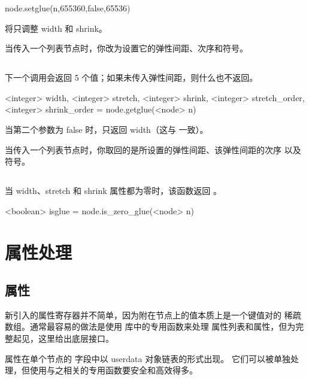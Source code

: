 \begin{typing}
node.setglue(n,655360,false,65536)
\end{typing}

将只调整 width 和 shrink。

当传入一个列表节点时，你改为设置它的弹性间距、次序和符号。

\subsection{}


下一个调用会返回 5 个值；如果未传入弹性间距，则什么也不返回。

\begin{typing}
<integer> width, <integer> stretch, <integer> shrink, <integer> stretch_order,
    <integer> shrink_order = node.getglue(<node> n)
\end{typing}

当第二个参数为 false 时，只返回 width（这与  一致）。

当传入一个列表节点时，你取回的是所设置的弹性间距、该弹性间距的次序
以及符号。

\subsection{}


当 width、stretch 和 shrink 属性都为零时，该函数返回 。

\begin{typing}
<boolean> isglue =
    node.is_zero_glue(<node> n)
\end{typing}

\section{属性处理}

\subsection{属性}


新引入的属性寄存器并不简单，因为附在节点上的值本质上是一个键值对的
稀疏数组。通常最容易的做法是使用  库中的专用函数来处理
属性列表和属性，但为完整起见，这里给出底层接口。

属性在单个节点的  字段中以 userdata 对象链表的形式出现。
它们可以被单独处理，但使用与之相关的专用函数要安全和高效得多。

